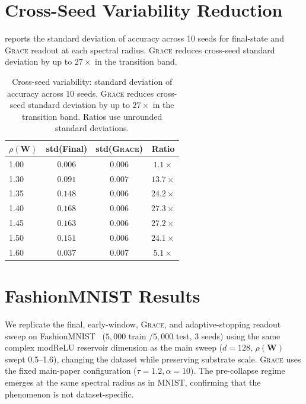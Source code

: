 \documentclass{article}
\theoremstyle{remark}
\newcommand{\bW}{\mathbf{W}}
\newcommand{\grace}{\textnormal{\textsc{Grace}}}
\newcommand{\sr}{\rho(\bW)}
\begin{document}
\section{Cross-Seed Variability Reduction}
\label{app:variance}

 reports the standard deviation of accuracy across 10
seeds for final-state and \grace{} readout at each spectral radius.
\grace{} reduces cross-seed standard deviation by up to $27\times$ in the
transition band.

\begin{table}[H]
\centering
\caption{Cross-seed variability: standard deviation of accuracy across 10 seeds.
\grace{} reduces cross-seed standard deviation by up to $27\times$ in the
transition band. Ratios use unrounded standard deviations.}
\label{tab:variance}
\small
\begin{tabular}{l c c c}
\toprule
$\sr$ & std(Final) & std(\grace{}) & Ratio \\
\midrule
1.00 & $0.006$ & $0.006$ & $1.1\times$\\
1.30 & $0.091$ & $0.007$ & $13.7\times$\\
1.35 & $0.148$ & $0.006$ & $24.2\times$\\
1.40 & $0.168$ & $0.006$ & $\mathbf{27.3\times}$\\
1.45 & $0.163$ & $0.006$ & $27.2\times$\\
1.50 & $0.151$ & $0.006$ & $24.1\times$\\
1.60 & $0.037$ & $0.007$ & $5.1\times$\\
\bottomrule
\end{tabular}
\end{table}

\section{FashionMNIST Results}
\label{app:fashion}
We replicate the final, early-window, \grace{}, and adaptive-stopping readout sweep on
FashionMNIST~\citep{xiao2017fashion} ($5{,}000$ train /$5{,}000$ test, 3
seeds) using the same complex modReLU reservoir dimension as the main sweep
($d=128$, $\sr$ swept 0.5--1.6), changing the dataset while preserving
substrate scale. \grace{} uses the fixed main-paper configuration
($\tau=1.2,\alpha=10$).
The pre-collapse regime emerges at the same spectral radius as in MNIST,
confirming that the phenomenon is not dataset-specific.
\end{document}

